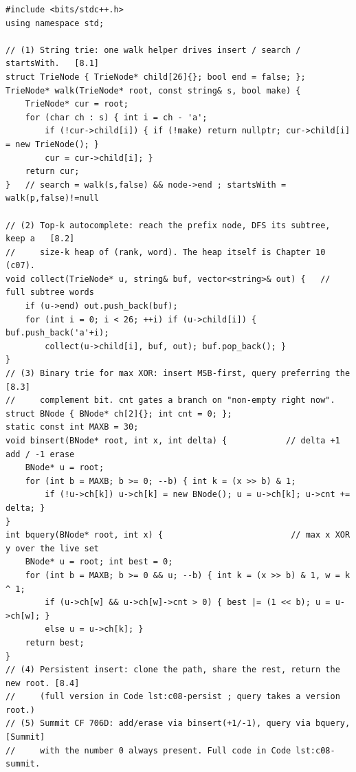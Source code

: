 \begin{lstlisting}[caption={Chapter 11 code kit: the string-trie walk, the autocomplete subtree collect, the binary-trie insert/greedy query, the persistent path-copy, and the Summit's live-multiset add/query}, label={lst:c08-kit}]
#include <bits/stdc++.h>
using namespace std;

// (1) String trie: one walk helper drives insert / search / startsWith.   [8.1]
struct TrieNode { TrieNode* child[26]{}; bool end = false; };
TrieNode* walk(TrieNode* root, const string& s, bool make) {
    TrieNode* cur = root;
    for (char ch : s) { int i = ch - 'a';
        if (!cur->child[i]) { if (!make) return nullptr; cur->child[i] = new TrieNode(); }
        cur = cur->child[i]; }
    return cur;
}   // search = walk(s,false) && node->end ; startsWith = walk(p,false)!=null

// (2) Top-k autocomplete: reach the prefix node, DFS its subtree, keep a   [8.2]
//     size-k heap of (rank, word). The heap itself is Chapter 10 (c07).
void collect(TrieNode* u, string& buf, vector<string>& out) {   // full subtree words
    if (u->end) out.push_back(buf);
    for (int i = 0; i < 26; ++i) if (u->child[i]) { buf.push_back('a'+i);
        collect(u->child[i], buf, out); buf.pop_back(); }
}
// (3) Binary trie for max XOR: insert MSB-first, query preferring the       [8.3]
//     complement bit. cnt gates a branch on "non-empty right now".
struct BNode { BNode* ch[2]{}; int cnt = 0; };
static const int MAXB = 30;
void binsert(BNode* root, int x, int delta) {            // delta +1 add / -1 erase
    BNode* u = root;
    for (int b = MAXB; b >= 0; --b) { int k = (x >> b) & 1;
        if (!u->ch[k]) u->ch[k] = new BNode(); u = u->ch[k]; u->cnt += delta; }
}
int bquery(BNode* root, int x) {                          // max x XOR y over the live set
    BNode* u = root; int best = 0;
    for (int b = MAXB; b >= 0 && u; --b) { int k = (x >> b) & 1, w = k ^ 1;
        if (u->ch[w] && u->ch[w]->cnt > 0) { best |= (1 << b); u = u->ch[w]; }
        else u = u->ch[k]; }
    return best;
}
// (4) Persistent insert: clone the path, share the rest, return the new root. [8.4]
//     (full version in Code lst:c08-persist ; query takes a version root.)
// (5) Summit CF 706D: add/erase via binsert(+1/-1), query via bquery,        [Summit]
//     with the number 0 always present. Full code in Code lst:c08-summit.
\end{lstlisting}


